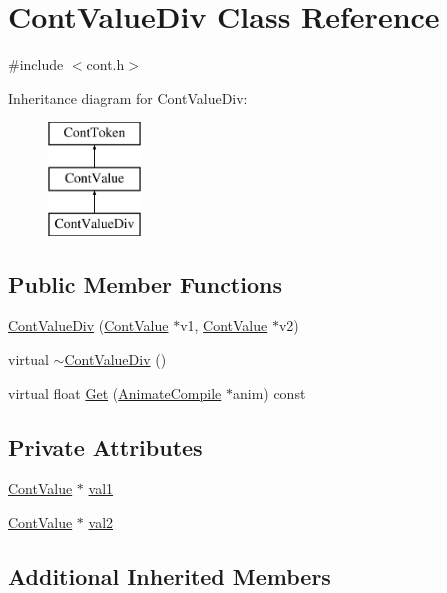 \hypertarget{a00089}{\section{Cont\-Value\-Div Class Reference}
\label{a00089}
}


{\ttfamily \#include $<$cont.\-h$>$}

Inheritance diagram for Cont\-Value\-Div\-:\begin{figure}[H]
\begin{center}
\leavevmode
\includegraphics[height=3.000000cm]{a00089}
\end{center}
\end{figure}
\subsection*{Public Member Functions}
\begin{DoxyCompactItemize}
\item 
\hyperlink{a00089_a2fb354f30c6cd09c83acbe8bd9e4cc8a}{Cont\-Value\-Div} (\hyperlink{a00086}{Cont\-Value} $\ast$v1, \hyperlink{a00086}{Cont\-Value} $\ast$v2)
\item 
virtual \hyperlink{a00089_a6da5488eeb2d2edd37afd3a58d83b3d3}{$\sim$\-Cont\-Value\-Div} ()
\item 
virtual float \hyperlink{a00089_aa16f65d0918f1fd43d00b9b500c32efe}{Get} (\hyperlink{a00007}{Animate\-Compile} $\ast$anim) const 
\end{DoxyCompactItemize}
\subsection*{Private Attributes}
\begin{DoxyCompactItemize}
\item 
\hyperlink{a00086}{Cont\-Value} $\ast$ \hyperlink{a00089_addfcd0e09c6bafda2d994676d7806d7b}{val1}
\item 
\hyperlink{a00086}{Cont\-Value} $\ast$ \hyperlink{a00089_af84919a87c2e8eb410484368f5172cb0}{val2}
\end{DoxyCompactItemize}
\subsection*{Additional Inherited Members}


